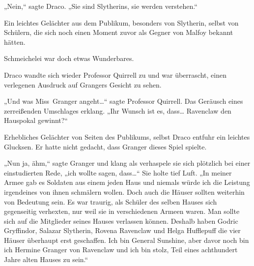 „Nein,“ sagte Draco. „Sie sind Slytherins, sie werden verstehen.“

Ein leichtes Gelächter aus dem Publikum, besonders von Slytherin, selbst von Schülern, die sich noch einen Moment zuvor als Gegner von Malfoy bekannt hätten.

Schmeichelei war doch etwas Wunderbares.

Draco wandte sich wieder Professor Quirrell zu und war überrascht, einen verlegenen Ausdruck auf Grangers Gesicht zu sehen.

„Und was Miss~Granger angeht…“ sagte Professor Quirrell. Das Geräusch eines zerreißenden Umschlages erklang. „Ihr Wunsch ist es, dass… Ravenclaw den Hauspokal gewinnt?“

Erhebliches Gelächter von Seiten des Publikums, selbst Draco entfuhr ein leichtes Glucksen. Er hatte nicht gedacht, dass Granger dieses Spiel spielte.

„Nun ja, ähm,“ sagte Granger und klang als verhaspele sie sich plötzlich bei einer einstudierten Rede, „ich wollte sagen, dass…“ Sie holte tief Luft. „In meiner Armee gab es Soldaten aus einem jeden Haus und niemals würde ich die Leistung irgendeines von ihnen schmälern wollen. Doch auch die Häuser sollten weiterhin von Bedeutung sein. Es war traurig, als Schüler des selben Hauses sich gegenseitig verhexten, nur weil sie in verschiedenen Armeen waren. Man sollte sich auf die Mitglieder seines Hauses verlassen können. Deshalb haben Godric Gryffindor, Salazar Slytherin, Rovena Ravenclaw und Helga Hufflepuff die vier Häuser überhaupt erst geschaffen. Ich bin General Sunshine, aber davor noch bin ich Hermine Granger von Ravenclaw und ich bin stolz, Teil eines achthundert Jahre alten Hauses zu sein.“

